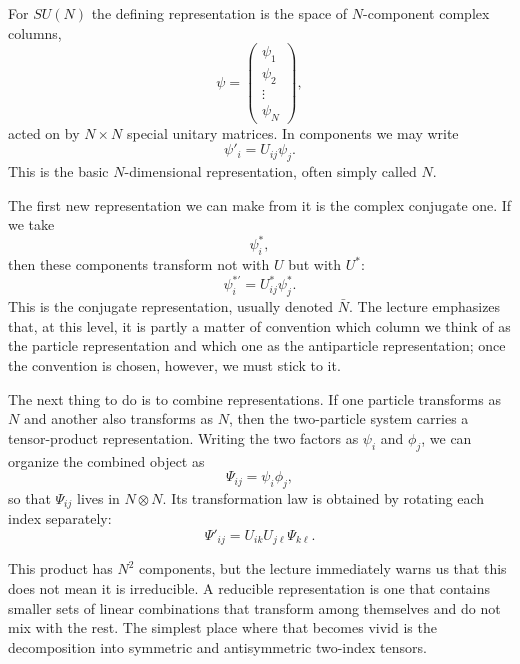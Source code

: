 For \(SU(N)\) the defining representation is the space of \(N\)-component complex columns,
\begin{equation}
\psi=
\begin{pmatrix}
\psi_1\\
\psi_2\\
\vdots\\
\psi_N
\end{pmatrix},
\end{equation}
acted on by \(N\times N\) special unitary matrices. In components we may write
\begin{equation}
\psi'_i = U_{ij}\psi_j.
\end{equation}
This is the basic \(N\)-dimensional representation, often simply called \(N\).

The first new representation we can make from it is the complex conjugate one. If we take
\[
\psi_i^*,
\]
then these components transform not with \(U\) but with \(U^*\):
\begin{equation}
\psi_i^{*\prime} = U_{ij}^*\psi_j^*.
\end{equation}
This is the conjugate representation, usually denoted \(\bar N\). The lecture emphasizes that, at this level, it is partly a matter of convention which column we think of as the particle representation and which one as the antiparticle representation; once the convention is chosen, however, we must stick to it.

The next thing to do is to combine representations. If one particle transforms as \(N\) and another also transforms as \(N\), then the two-particle system carries a tensor-product representation. Writing the two factors as \(\psi_i\) and \(\phi_j\), we can organize the combined object as
\begin{equation}
\Psi_{ij}=\psi_i\phi_j,
\end{equation}
so that \(\Psi_{ij}\) lives in \(N\otimes N\). Its transformation law is obtained by rotating each index separately:
\begin{equation}
\Psi'_{ij}=U_{ik}U_{j\ell}\Psi_{k\ell}.
\end{equation}

This product has \(N^2\) components, but the lecture immediately warns us that this does not mean it is irreducible. A reducible representation is one that contains smaller sets of linear combinations that transform among themselves and do not mix with the rest. The simplest place where that becomes vivid is the decomposition into symmetric and antisymmetric two-index tensors.

